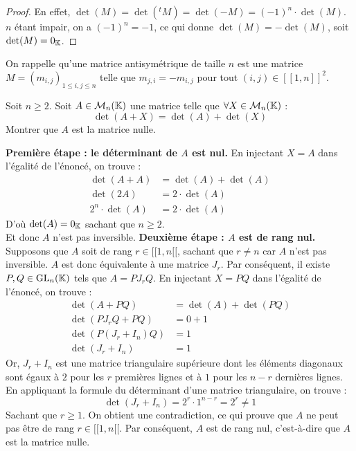 \documentclass[12pt, a4paper]{report}
\begin{document}
\begin{proof}
    En effet, $\det(M) = \det(^t M) = \det(-M) = (-1)^n \cdot \det(M)$. $n$ étant impair, on a $(-1)^n = -1$, ce qui donne $\det(M) = -\det(M)$, soit $\det(M) = 0_{\mathbb{K}}$.
\end{proof}

On rappelle qu'une matrice antisymétrique de taille $n$ est une matrice $M = (m_{i,j})_{1 \le i,j \le n}$ telle que $m_{j,i} = -m_{i,j}$ pour tout $(i, j) \in [\![1,n]\!]^2$.

\begin{exercise}
    Soit $n\ge 2$. Soit $A \in \mathcal M_n(\mathbb{K})$ une matrice telle que $\forall X \in \mathcal M_n(\mathbb{K})$ :
    $$\det(A + X) = \det(A) + \det(X)$$
    Montrer que $A$ est la matrice nulle.
\end{exercise}

\begin{outline}
\1 \textbf{Première étape : le déterminant de $A$ est nul.}
    \2 En injectant $X=A$ dans l'égalité de l'énoncé, on trouve :
    \begin{align*}
        \det(A + A) &= \det(A) + \det(A) \\
        \det(2A) &= 2 \cdot \det(A) \\
        2^n \cdot \det(A) &= 2 \cdot \det(A)
    \end{align*}
    D'où $\det(A) = 0_{\mathbb{K}}$ sachant que $n \ge 2$.\\
    Et donc $A$ n'est pas inversible.
\1 \textbf{Deuxième étape : $A$ est de rang nul.}
    \2 Supposons que $A$ soit de rang $r \in [\![1,n[\![$, sachant que $r \ne n$ car $A$ n'est pas inversible.
    \2 $A$ est donc équivalente à une matrice $J_r$.
    \2 Par conséquent, il existe $P, Q \in \mathrm{GL}_n(\mathbb{K})$ tels que $A = P J_r Q$.
    \2 En injectant $X = P Q$ dans l'égalité de l'énoncé, on trouve :
    \begin{align*}
        \det(A + P Q) &= \det(A) + \det(P Q) \\
        \det(P J_r Q + P Q) &= 0 + 1 \\
        \det(P (J_r + I_n) Q) &= 1 \\
        \det(J_r + I_n) &= 1
    \end{align*}
    \2 Or, $J_r + I_n$ est une matrice triangulaire supérieure dont les éléments diagonaux sont égaux à $2$ pour les $r$ premières lignes et à $1$ pour les $n-r$ dernières lignes. En appliquant la formule du déterminant d'une matrice triangulaire, on trouve :
    $$\det(J_r + I_n) = 2^r \cdot 1^{n-r} = 2^r \ne 1$$
    Sachant que $r \ge 1$.
    \2 On obtient une contradiction, ce qui prouve que $A$ ne peut pas être de rang $r \in [\![1,n[\![$. Par conséquent, $A$ est de rang nul, c'est-à-dire que $A$ est la matrice nulle.
\end{outline}
\end{document}
